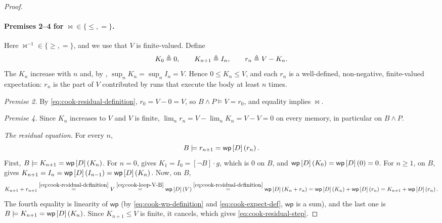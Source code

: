 \begin{proof}
\paragraph{Premises 2--4 for $\bowtie\in\{\leq,=\}$.}
Here $\bowtie^{-1}\in\{\geq,=\}$, and we use that $V$ is finite-valued.
Define
\begin{equation}
  K_0\triangleq0,
  \qquad
  K_{n+1}\triangleq I_n,
  \qquad
  r_n\triangleq V-K_n.
  \label{eq:cook-residual-definition}
\end{equation}
The $K_n$ increase with $n$ and, by ,
$\sup_n K_n=\sup_n I_n=V$.  Hence $0\leq K_n\leq V$, and each $r_n$ is a
well-defined, non-negative, finite-valued expectation: $r_n$ is the part of
$V$ contributed by runs that execute the body at least $n$ times.

\noindent\emph{Premise 2.}
By \eqref{eq:cook-residual-definition}, $r_0=V-0=V$, so $B\land P\models V=r_0$,
and equality implies $\bowtie$.

\noindent\emph{Premise 4.}
Since $K_n$ increases to $V$ and $V$ is finite,
$\lim_n r_n=V-\lim_n K_n=V-V=0$ on every memory, in particular on $B\land P$.

\noindent\emph{The residual equation.}
For every $n$,
\begin{equation}
  B\models r_{n+1}=\mathsf{wp}\left[{D}\right]\left({r_n}\right).
  \label{eq:cook-residual-step}
\end{equation}
First, $B\models K_{n+1}=\mathsf{wp}\left[{D}\right]\left({K_n}\right)$.  For $n=0$, 
gives $K_1=I_0=[\neg B]\cdot g$, which is $0$ on $B$, and
$\mathsf{wp}\left[{D}\right]\left({K_0}\right)=\mathsf{wp}\left[{D}\right]\left({0}\right)=0$.  For $n\geq1$, on $B$,
 gives $K_{n+1}=I_n=\mathsf{wp}\left[{D}\right]\left({I_{n-1}}\right)=\mathsf{wp}\left[{D}\right]\left({K_n}\right)$.
Now, on $B$,
\[
  K_{n+1}+r_{n+1}
  \overset{\eqref{eq:cook-residual-definition}}{=}
  V
  \overset{\eqref{eq:cook-loop-V-B}}{=}
  \WP{D}{V}
  \overset{\eqref{eq:cook-residual-definition}}{=}
  \WP{D}{K_n+r_n}
  =
  \WP{D}{K_n}+\WP{D}{r_n}
  =
  K_{n+1}+\WP{D}{r_n}.
\]
The fourth equality is linearity of $\mathsf{wp}$ (by
\eqref{eq:cook-wp-definition} and \eqref{eq:cook-expect-def}, $\mathsf{wp}$ is
a sum), and the last one is $B\models K_{n+1}=\mathsf{wp}\left[{D}\right]\left({K_n}\right)$.  Since
$K_{n+1}\leq V$ is finite, it cancels, which gives
\eqref{eq:cook-residual-step}.


\end{proof}
